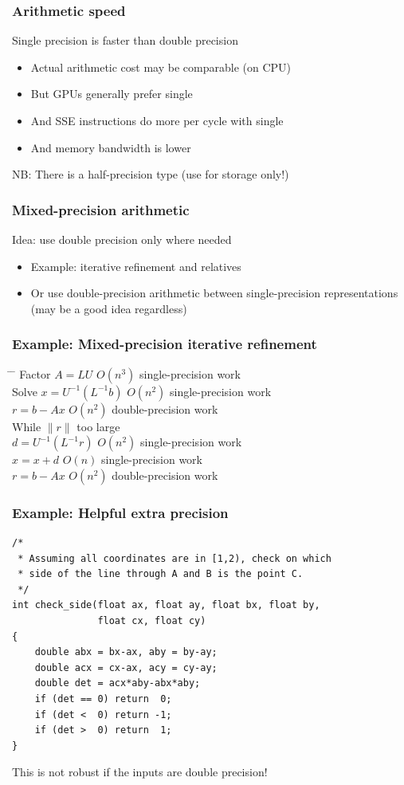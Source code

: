 \documentclass{beamer}
\begin{document}
\begin{frame}
  \frametitle{Arithmetic speed}

  Single precision is faster than double precision
  \begin{itemize}
  \item Actual arithmetic cost may be comparable (on CPU)
  \item But GPUs generally prefer single
  \item And SSE instructions do more per cycle with single
  \item And memory bandwidth is lower
  \end{itemize}
  NB: There is a half-precision type (use for storage only!)
  
\end{frame}


\begin{frame}
  \frametitle{Mixed-precision arithmetic}

  Idea: use double precision only where needed
  \begin{itemize}
  \item Example: iterative refinement and relatives
  \item Or use double-precision arithmetic between
    single-precision representations (may be a good idea regardless)
  \end{itemize}
\end{frame}


\begin{frame}
  \frametitle{Example: Mixed-precision iterative refinement}

\begin{tabbing}
\qquad \= \hspace{4cm} \= \kill
Factor $A = LU$ \>\> $O(n^3)$ single-precision work\\
Solve $x = U^{-1} (L^{-1} b)$ \>\> $O(n^2)$ single-precision work \\
$r = b-Ax$ \>\> $O(n^2)$ double-precision work \\
While $\|r\|$ too large \\
\> $d = U^{-1} (L^{-1} r)$ \> $O(n^2)$ single-precision work\\
\> $x = x+d$ \> $O(n)$ single-precision work \\
\> $r = b-Ax$ \> $O(n^2)$ double-precision work
\end{tabbing}

\end{frame}


\begin{frame}[fragile]
  \frametitle{Example: Helpful extra precision}

\begin{lstlisting}
/*
 * Assuming all coordinates are in [1,2), check on which
 * side of the line through A and B is the point C.
 */
int check_side(float ax, float ay, float bx, float by, 
               float cx, float cy)
{
    double abx = bx-ax, aby = by-ay;
    double acx = cx-ax, acy = cy-ay;
    double det = acx*aby-abx*aby;
    if (det == 0) return  0;
    if (det <  0) return -1;
    if (det >  0) return  1;
}
\end{lstlisting}
This is not robust if the inputs are double precision!
\end{frame}
\end{document}
